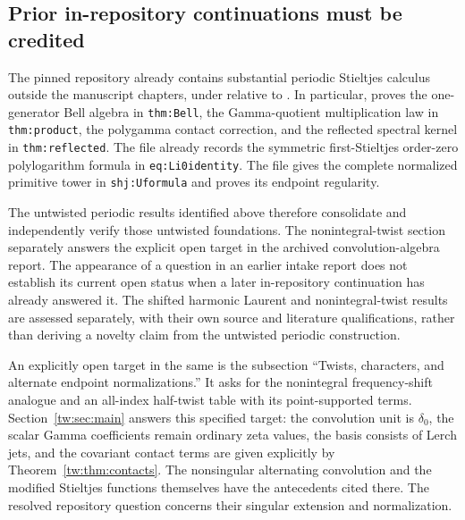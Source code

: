 \documentclass[11pt,letterpaper]{article}
\numberwithin{equation}{section}
\theoremstyle{plain}
\theoremstyle{definition}
\theoremstyle{remark}
\begin{document}
\subsection{Prior in-repository continuations must be credited}

The pinned repository already contains substantial periodic Stieltjes
calculus outside the manuscript chapters, under
relative to  \cite{RepoConvolutionAlgebra,RepoConvolutionCalculus,RepoShiftedJets}.
In particular,  proves the
one-generator Bell algebra in \texttt{thm:Bell}, the Gamma-quotient
multiplication law in \texttt{thm:product}, the polygamma contact
correction, and the reflected spectral kernel in
\texttt{thm:reflected}.  The file
already records the symmetric first-Stieltjes order-zero
polylogarithm formula in \texttt{eq:Li0identity}.
The file  gives the complete
normalized primitive tower in \texttt{shj:Uformula} and proves its
endpoint regularity.

The untwisted periodic results identified above therefore consolidate and
independently verify those untwisted foundations. The nonintegral-twist
section separately answers the explicit open target in the archived
convolution-algebra report.  The appearance of a
question in an earlier intake report does not establish its current open
status when a later in-repository continuation has already answered it.
The shifted harmonic Laurent and nonintegral-twist results are assessed
separately, with their own source and literature qualifications, rather
than deriving a novelty claim from the untwisted periodic construction.

An explicitly open target in the same
 is the subsection
``Twists, characters, and alternate endpoint normalizations.''
It asks for the nonintegral frequency-shift analogue and an all-index
half-twist table with its point-supported terms.
Section~\ref{tw:sec:main} answers this specified target: the convolution
unit is $\delta_0$, the scalar Gamma coefficients remain ordinary zeta
values, the basis consists of Lerch jets, and the covariant contact
terms are given explicitly by Theorem~\ref{tw:thm:contacts}.
The nonsingular alternating convolution and the modified Stieltjes
functions themselves have the antecedents cited there.  The resolved
repository question concerns their singular extension and normalization.
\end{document}
